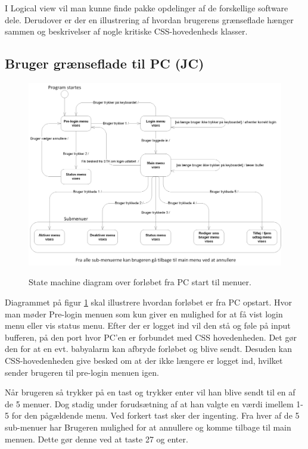 I Logical view vil man kunne finde pakke opdelinger af de forskellige software dele. Derudover er der en illustrering af hvordan brugerens grænseflade hænger sammen og beskrivelser af nogle kritiske CSS-hovedenheds klasser.

\subsection{Bruger grænseflade til PC (JC)}

\begin{figure}[!htb]
     {\includegraphics[width=\textwidth]{billeder/uml/state_machine_main}}
     \caption{State machine diagram over forløbet fra PC start til menuer.}
     \label{fig:State_machine_pc}
\end{figure}

Diagrammet på figur \ref{fig:State_machine_pc} skal illustrere hvordan forløbet er fra PC opstart. Hvor man møder Pre-login menuen som kun giver en mulighed for at få vist login menu eller vis status menu. Efter der er logget ind vil den stå og føle på input bufferen, på den port hvor PC'en er forbundet med CSS hovedenheden. Det gør den for at en evt. babyalarm kan afbryde forløbet og blive sendt. Desuden kan CSS-hovedenheden give besked om at der ikke længere er logget ind, hvilket sender brugeren til pre-login menuen igen.

\medskip

Når brugeren så trykker på en tast og trykker enter vil han blive sendt til en af de 5 menuer. Dog stadig under forudsætning af at han valgte en værdi imellem 1-5 for den pågældende menu. Ved forkert tast sker der ingenting. Fra hver af de 5 sub-menuer har Brugeren mulighed for at annullere og komme tilbage til main menuen. Dette gør denne ved at taste 27 og enter.


